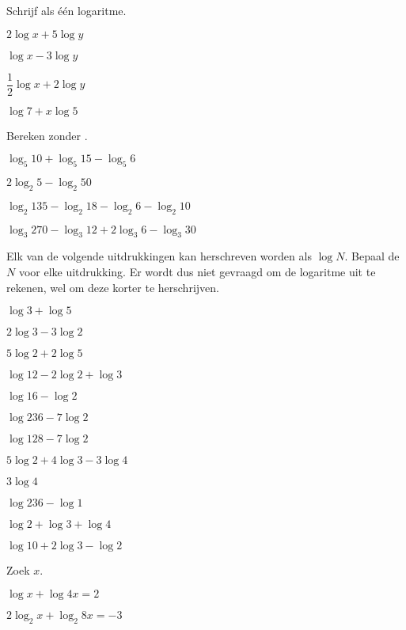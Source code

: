 \documentclass[12pt,twoside]{article}
\begin{document}
\begin{oefening} %
Schrijf als één logaritme.
\begin{exlist}{2}
  \item $2\log x + 5 \log y$
  \item $\log x - 3 \log y$
  \item $\dfrac{1}{2}\log x + 2 \log y$
  \item $\log 7 + x \log 5$
\end{exlist}
\end{oefening}

\begin{oefening} %
Bereken zonder .
\begin{exlist}{2}
  \item $\log_5 10 + \log_5 15 - \log_5 6$
  \item $2\log_2 5 - \log_2 50$
  \item $\log_2 135 - \log_2 18 - \log_2 6 - \log_2 10$
  \item $\log_3 270 - \log_3 12 + 2\log_3 6 - \log_3 30$
\end{exlist}
\end{oefening}

\begin{oefening} %
Elk van de volgende uitdrukkingen kan herschreven worden als $\log N$. Bepaal de $N$ voor elke uitdrukking. Er wordt dus niet gevraagd om de logaritme uit te rekenen, wel om deze korter te herschrijven.
\begin{exlist}{2}
  \item $\log 3 + \log 5$
  \item $2\log 3 - 3\log 2$
  \item $5\log 2 + 2\log 5$
  \item $\log 12 - 2\log 2 + \log 3$
  \item $\log 16 - \log 2$
  \item $\log 236 - 7\log 2$
  \item $\log 128 - 7\log 2$
  \item $5\log 2 + 4\log 3 - 3\log 4$
  \item $3\log 4$
  \item $\log 236 - \log 1$
  \item $\log 2 + \log 3 + \log 4$
  \item $\log 10 + 2\log 3 - \log 2$
\end{exlist}
\end{oefening}

\begin{oefening} %
Zoek $x$.
\begin{exlist}{2}
  \item $\log x + \log 4x = 2$
  \item $2\log_2 x + \log_2 8x = -3$
\end{exlist}
\end{oefening}
\end{document}
